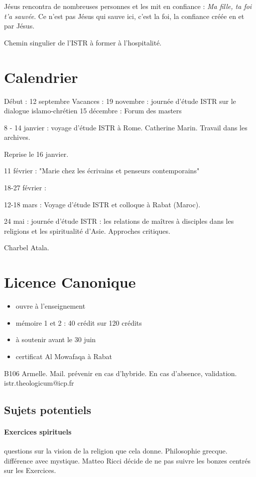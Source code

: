 Jésus rencontra de nombreuses personnes et les mit en confiance : \textit{Ma fille, ta foi t'a sauvée}. Ce n'est pas Jésus qui sauve ici, c'est la foi, la confiance créée en et par Jésus.

Chemin singulier de l'ISTR à former à l'hospitalité.


\section{Calendrier}
Début : 12 septembre
Vacances : 
19 novembre : journée d'étude ISTR sur le dialogue islamo-chrétien
15 décembre : Forum des masters

8 - 14 janvier : voyage d'étude ISTR à Rome. Catherine Marin. Travail dans les archives.

Reprise le 16 janvier. 

11 février : "Marie chez les écrivains et penseurs contemporains"

18-27 février :


12-18 mars : Voyage d'étude ISTR et colloque à Rabat (Maroc).

24 mai : journée d'étude ISTR : les relations de maîtres à disciples dans les religions et les spiritualité d'Asie. Approches critiques.

Charbel Atala. 

\section{Licence Canonique}

\begin{itemize}
   \item ouvre à l'enseignement
\item mémoire 1 et 2 : 40 crédit sur 120 crédits
\item à soutenir avant le 30 juin
\item certificat Al Mowafaqa à Rabat
\end{itemize}


B106 Armelle. Mail. prévenir en cas d'hybride. En cas d'absence, validation.  istr.theologicum@icp.fr

\subsection{Sujets potentiels}

\paragraph{Exercices spirituels} questions sur la vision de la religion que cela donne. Philosophie grecque. différence avec mystique. Matteo Ricci décide de ne pas suivre les bonzes centrés sur les Exercices. 


